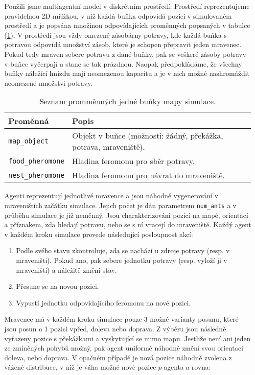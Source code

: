 \documentclass[10pt,a4paper,twocolumn]{article}
\begin{document}
Použili jsme multiagentní model v diskrétním prostředí. Prostředí reprezentujeme 
pravidelnou 2D mřížkou, v níž každá buňka odpovídá pozici v simulovaném prostředí a je 
popsána množinou odpovídajících proměnných popsaných v tabulce (\ref{table:mapa}).
V prostředí jsou vždy omezené zásobárny potravy, kde každá buňka s potravou
odpovídá množství zásob, které je schopen přepravit jeden mravenec. Pokud
tedy mraven sebere potravu z dané buňky, pak se veškeré zásoby potravy v 
buňce vyčerpají a stane se tak prázdnou. Naopak předpokládáme, že všechny
buňky náležící hnízdu mají neomezenou kapacitu a je v nich možné 
nashromáždit neomezené množství potravy.


\begin{table}[t]
  \centering %
  \begin{tabular}{l p{5cm}}
  \toprule
  Proměnná & Popis \\
  \midrule
    \texttt{map\_object} & Objekt v buňce (možnosti:
    žádný, překážka, potrava, mraveniště). \\
    \texttt{food\_pheromone} & Hladina feromonu pro sběr potravy.\\
    \texttt{nest\_pheromone} & Hladina feromonu pro návrat do mraveniště.\\	
  \bottomrule
  \end{tabular}
  \caption{Seznam promměnných jedné buňky mapy simulace.} \label{table:mapa} 
\end{table}


Agenti reprezentují jednotlivé mravence a jsou náhodně 
vygenerování v mraveništích začátku simulace. Jejich počet je dán 
parametrem \texttt{num\_ants} a 
v průběhu simulace je již neměnný. Jsou charakterizováni pozicí na mapě,
orientací a příznakem, zda hledají potravu, nebo se s ní vracejí do mraveniště.
Každý agent v každém kroku simulace provede následující posloupnost akcí:

\begin{enumerate}
  \item Podle svého stavu zkontroluje, zda se nachází u zdroje potravy 
  (resp. v mraveništi). Pokud ano, pak sebere jednotku potravy 
  (resp. vyloží ji v mraveništi) a náležitě změní stav.
  \item Přesune se na novou pozici.
  \item Vypustí jednotku odpovídajícího feromonu na nové pozici.
\end{enumerate}

Mravenec má v každém kroku simulace pouze 3 možné varianty posunu, které 
jsou posun o 1 pozici vpřed, doleva nebo doprava. Z výběru jsou následně vyřazeny
pozice s překážkami a vyskytující se mimo mapu. Jestliže není ani jeden ze zmíněných 
pohybů možný, pak agent uniformě náhodně změní svou orientaci doleva, nebo
doprava. V opačném případě je nová pozice náhodně zvolena z vážené distribuce, 
v níž je váha možné nové pozice $p$ agenta $a$ rovna:
\end{document}
